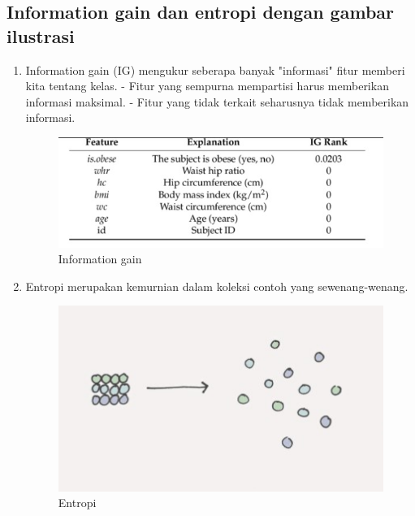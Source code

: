 \subsection{Information gain dan entropi dengan gambar ilustrasi}
\begin{enumerate}
\item Information gain (IG) mengukur seberapa banyak "informasi" fitur memberi kita tentang kelas. - Fitur yang sempurna mempartisi harus memberikan informasi maksimal. - Fitur yang tidak terkait seharusnya tidak memberikan informasi.
\begin{figure}[ht]
\centering
\includegraphics[scale=0.5]{figures/f7.jpg}
\caption{Information gain}
\label{contoh}
\end{figure}

\item Entropi merupakan kemurnian dalam koleksi contoh yang sewenang-wenang.
\begin{figure}[ht]
\centering
\includegraphics[scale=0.7]{figures/f8.jpg}
\caption{Entropi}
\label{contoh}
\end{figure}

\end{enumerate}

